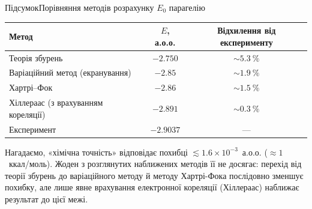 \documentclass[10pt]{beamer}
\begin{document}
\begin{frame}{Підсумок}{Порівняння методів розрахунку $E_0$ парагелію}
	\begin{center}\small
		\begin{tabular}{lcc}
			\toprule
			Метод                                & $E$, а.о.о. & Відхилення від експерименту \\
			\midrule
			Теорія збурень                       & $-2.750$    & $\sim 5.3~\%$                \\
			Варіаційний метод (екранування)      & $-2.85$     & $\sim 1.9~\%$                \\
			Хартрі--Фок                          & $-2.86$     & $\sim 1.5~\%$                \\
			Хіллераас (з врахуванням кореляції)  & $-2.891$    & $\sim 0.3~\%$                \\
			\midrule
			Експеримент                          & $-2.9037$   & ---                          \\
			\bottomrule
		\end{tabular}
	\end{center}

	\medskip

	\begin{alertblock}{}\justifying
		Нагадаємо, «хімічна точність» відповідає похибці $\lesssim 1.6 \times 10^{-3}$~а.о.о. ($\approx 1$~ккал/моль). Жоден з розглянутих наближених методів її не досягає: перехід від теорії збурень до варіаційного методу й методу Хартрі-Фока послідовно зменшує похибку, але лише явне врахування \alert{електронної кореляції} (Хіллераас) наближає результат до цієї межі.
	\end{alertblock}
\end{frame}





\end{document}
